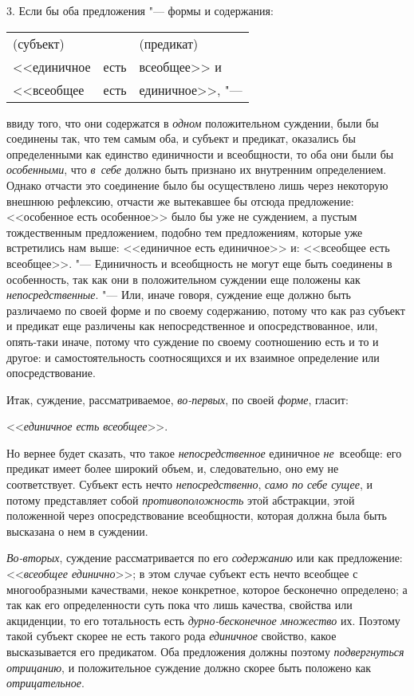 3. Если бы оба предложения "--- формы и содержания:\label{bkm:bm34a}

\begin{center}
\begin{tabular}{l c l}
(субъект) & \  & (предикат) \\
<<единичное & есть & всеобщее>> и \\
<<всеобщее & есть & единичное>>, "---
\end{tabular}
\end{center}

\noindent ввиду того, что они содержатся в {\em одном} положительном
суждении, были бы соединены так, что тем самым оба, и субъект и предикат,
оказались бы определенными как единство единичности и всеобщности, то оба
они были бы {\em особенными}, что {\em в~себе}
должно быть признано их внутренним определением. Однако
отчасти это соединение было бы осуществлено лишь через некоторую внешнюю
рефлексию, отчасти же вытекавшее бы отсюда предложение: <<особенное есть
особенное>> было бы уже не суждением, а пустым тождественным предложением,
подобно тем предложениям, которые уже встретились нам выше: <<единичное есть
единичное>> и: <<всеобщее есть всеобщее>>. "--- Единичность и
всеобщность не могут еще быть соединены в особенность, так как они в
положительном суждении еще положены как {\em непосредственные}. "---
Или, иначе говоря, суждение еще должно быть различаемо по
своей форме и по своему содержанию, потому что как раз субъект и предикат
еще различены как непосредственное и опосредствованное, или, опять-таки
иначе, потому что суждение по своему соотношению есть и то и другое: и
самостоятельность соотносящихся и их взаимное определение или опосредствование.

Итак, суждение, рассматриваемое, {\em во-первых}, по своей {\em форме}, гласит:

<<{\em единичное есть всеобщее}>>.

Но вернее будет сказать, что такое {\em непосредственное} единичное
{\em не}~всеобще: его предикат имеет более широкий объем, и,
следовательно, оно ему не соответствует. Субъект есть нечто
{\em непосредственно}, {\em само по себе сущее}, и потому представляет собой
{\em противоположность} этой абстракции, этой положенной через опосредствование
всеобщности, которая должна была быть высказана о нем в суждении.

{\em Во-вторых}, суждение рассматривается по его {\em содержанию} или как
предложение: <<{\em всеобщее единично}>>; в этом случае субъект есть нечто
всеобщее с многообразными качествами, некое конкретное, которое бесконечно
определено; а так как его определенности суть пока что лишь качества, свойства
или акциденции, то его тотальность есть {\em дурно-бесконечное множество} их.
Поэтому такой субъект скорее не есть такого рода {\em единичное} свойство,
какое высказывается его предикатом. Оба предложения должны поэтому
{\em подвергнуться отрицанию}, и положительное суждение должно скорее быть
положено как {\em отрицательное}.

